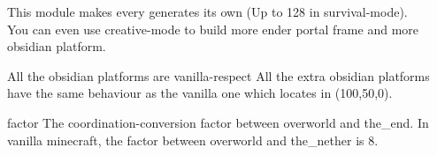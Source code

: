 
This module makes every  generates its own  (Up to 128 in survival-mode).\\
You can even use creative-mode to build more ender portal frame and more obsidian platform.

\begin{note}{All the obsidian platforms are vanilla-respect}
    All the extra obsidian platforms have the same behaviour as the vanilla one which locates in (100,50,0).
\end{note}

\begin{Configuration}
    \item[factor]{
        The coordination-conversion factor between overworld and the\_end.
        In vanilla minecraft, the factor between overworld and the\_nether is 8.
    }
\end{Configuration}
